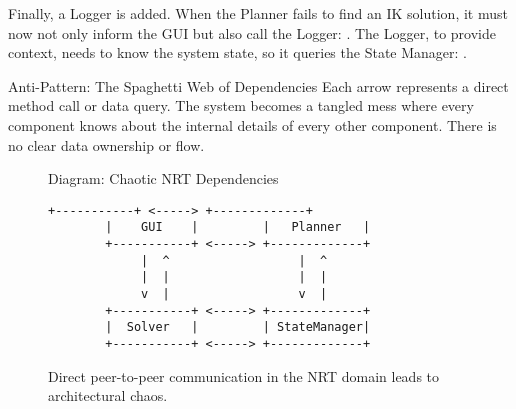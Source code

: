 Finally, a Logger is added. When the Planner fails to find an IK solution, it must now not only inform the GUI but also call the Logger: . The Logger, to provide context, needs to know the system state, so it queries the State Manager: .


\begin{dangerbox}{Anti-Pattern: The Spaghetti Web of Dependencies}
{Each arrow represents a direct method call or data query. The system becomes a tangled mess where every component knows about the internal details of every other component. There is no clear data ownership or flow.}
\end{dangerbox}


\begin{figure}[htbp!] %
    \centering
    \begin{infobox}{Diagram: Chaotic NRT Dependencies} %
        \begin{lstlisting}[language=Text, basicstyle=\ttfamily\small, columns=fixed, frame=none, numbers=none, showstringspaces=false, breaklines=false, breakatwhitespace=false, aboveskip=0.5cm, belowskip=0.5cm]
        +-----------+ <-----> +-------------+
        |    GUI    |         |   Planner   |
        +-----------+ <-----> +-------------+
             |  ^                  |  ^          
             |  |                  |  |          
             v  |                  v  |          
        +-----------+ <-----> +-------------+
        |  Solver   |         | StateManager|
        +-----------+ <-----> +-------------+
        \end{lstlisting}
    \end{infobox}
    \caption{Direct peer-to-peer communication in the NRT domain leads to architectural chaos.}
    \label{fig:spaghetti_architecture}
\end{figure}

